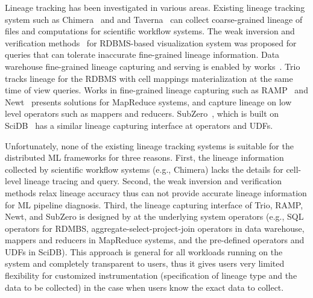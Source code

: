 \documentclass{sig-alternate}
\begin{document}
Lineage tracking has been investigated in various areas.
Existing lineage tracking system such as Chimera~\cite{foster02} and and Taverna~\cite{oinn02} can collect coarse-grained lineage 
of files and computations for scientific workflow systems.
The weak inversion and verification methods~\cite{woodruff97} for RDBMS-based visualization system 
was proposed for queries that can tolerate inaccurate fine-grained lineage information.
Data warehouse fine-grained lineage capturing and serving is enabled by works~\cite{cui00, cui03}.
Trio~\cite{widom04} tracks lineage for the RDBMS with cell mappings materialization at the same time of view queries.
Works in fine-grained lineage capturing such as RAMP~\cite{ikeda11, park11} and Newt~\cite{logothetis13} presents
solutions for MapReduce systems, and capture lineage on low level operators such as mappers and reducers.
SubZero~\cite{wu13}, which is built on SciDB~\cite{brown10} has a similar lineage capturing interface at operators and UDFs.

Unfortunately, none of the existing lineage tracking systems is suitable for the distributed ML frameworks for three reasons.
First, the lineage information collected by scientific workflow systems (e.g., Chimera) lacks the details for cell-level lineage tracing and query.
Second, the weak inversion and verification methods relax lineage accuracy thus can not provide accurate lineage information for ML pipeline diagnosis.
Third, the lineage capturing interface of Trio, RAMP, Newt, and SubZero is designed by at
the underlying system operators (e.g., SQL operators for RDMBS, aggregate-select-project-join operators in data warehouse, 
mappers and reducers in MapReduce systems, and the pre-defined operators and UDFs in SciDB). 
This approach is general for all workloads running on the system and completely transparent to users, 
thus it gives users very limited flexibility for customized instrumentation (specification of lineage type and the data to be collected) 
in the case when users know the exact data to collect.
\end{document}
